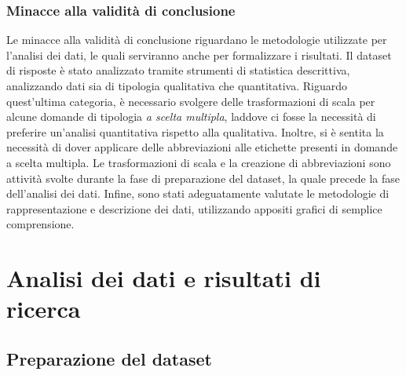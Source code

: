 \subsection{Minacce alla validità di conclusione}
Le minacce alla validità di conclusione riguardano le metodologie utilizzate per l'analisi dei dati, le quali serviranno anche per formalizzare i risultati. Il dataset di risposte è stato analizzato tramite strumenti di statistica descrittiva, analizzando dati sia di tipologia qualitativa che quantitativa. Riguardo quest'ultima categoria, è necessario svolgere delle trasformazioni di scala per alcune domande di tipologia \emph{a scelta multipla}, laddove ci fosse la necessità di preferire un'analisi quantitativa rispetto alla qualitativa. Inoltre, si è sentita la necessità di dover applicare delle abbreviazioni alle etichette presenti in domande a scelta multipla. Le trasformazioni di scala e la creazione di abbreviazioni sono attività svolte durante la fase di preparazione del dataset, la quale precede la fase dell'analisi dei dati. Infine, sono stati adeguatamente valutate le metodologie di rappresentazione e descrizione dei dati, utilizzando appositi grafici di semplice comprensione.

\chapter{Analisi dei dati e risultati di ricerca}
\section{Preparazione del dataset}
